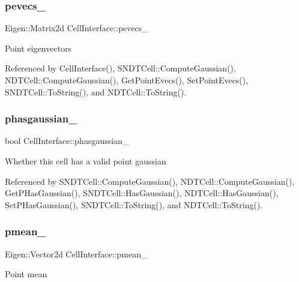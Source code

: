 \subsubsection{\texorpdfstring{pevecs\+\_\+}{pevecs\_}}
{\footnotesize\ttfamily Eigen\+::\+Matrix2d Cell\+Interface\+::pevecs\+\_\+\hspace{0.3cm}{\ttfamily [protected]}}

Point eigenvectors 

Referenced by Cell\+Interface(), S\+N\+D\+T\+Cell\+::\+Compute\+Gaussian(), N\+D\+T\+Cell\+::\+Compute\+Gaussian(), Get\+Point\+Evecs(), Set\+Point\+Evecs(), S\+N\+D\+T\+Cell\+::\+To\+String(), and N\+D\+T\+Cell\+::\+To\+String().

\mbox{\label{classCellInterface_a15dded52d2271347ef711b81575bde1e}} 
\subsubsection{\texorpdfstring{phasgaussian\+\_\+}{phasgaussian\_}}
{\footnotesize\ttfamily bool Cell\+Interface\+::phasgaussian\+\_\+\hspace{0.3cm}{\ttfamily [protected]}}

Whether this cell has a valid point gaussian 

Referenced by S\+N\+D\+T\+Cell\+::\+Compute\+Gaussian(), N\+D\+T\+Cell\+::\+Compute\+Gaussian(), Get\+P\+Has\+Gaussian(), S\+N\+D\+T\+Cell\+::\+Has\+Gaussian(), N\+D\+T\+Cell\+::\+Has\+Gaussian(), Set\+P\+Has\+Gaussian(), S\+N\+D\+T\+Cell\+::\+To\+String(), and N\+D\+T\+Cell\+::\+To\+String().

\mbox{\label{classCellInterface_ae597d408c22886e04f371dff9a023828}} 
\subsubsection{\texorpdfstring{pmean\+\_\+}{pmean\_}}
{\footnotesize\ttfamily Eigen\+::\+Vector2d Cell\+Interface\+::pmean\+\_\+\hspace{0.3cm}{\ttfamily [protected]}}

Point mean 

